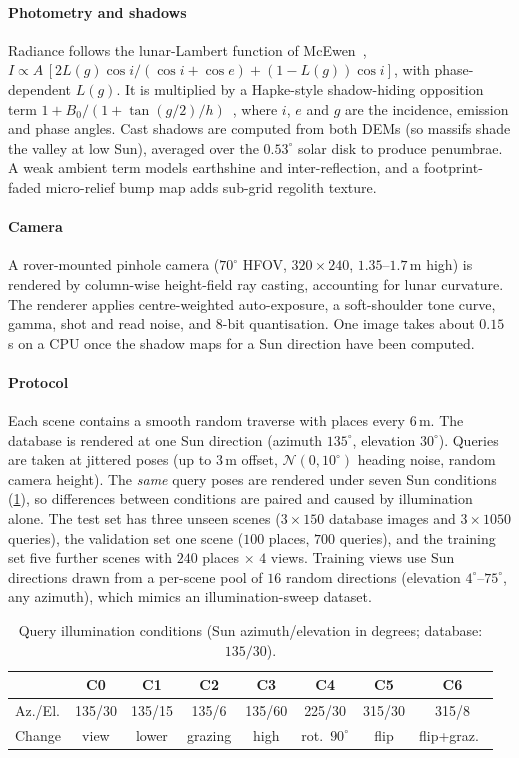 \paragraph*{Photometry and shadows}
Radiance follows the lunar-Lambert function of McEwen~\cite{mcewen1991photometric},
$I\propto A\,[2L(g)\cos i/(\cos i+\cos e)+(1-L(g))\cos i]$, with phase-dependent $L(g)$. It is
multiplied by a Hapke-style shadow-hiding opposition term
$1+B_0/(1+\tan(g/2)/h)$~\cite{hapke2012theory}, where $i$, $e$ and $g$ are the incidence, emission and
phase angles. Cast shadows are computed from both DEMs (so massifs shade the valley at low Sun),
averaged over the $0.53^\circ$ solar disk to produce penumbrae. A weak ambient term models
earthshine and inter-reflection, and a footprint-faded micro-relief bump map adds sub-grid regolith
texture.

\paragraph*{Camera}
A rover-mounted pinhole camera ($70^\circ$ HFOV, $320\times240$, $1.35$--$1.7$\,m high) is rendered
by column-wise height-field ray casting, accounting for lunar curvature. The renderer applies
centre-weighted auto-exposure, a soft-shoulder tone curve, gamma, shot and read noise, and 8-bit
quantisation. One image takes about $0.15$\,s on a CPU once the shadow maps for a Sun direction
have been computed.

\paragraph*{Protocol}
Each scene contains a smooth random traverse with places every $6$\,m. The database is rendered at
one Sun direction (azimuth $135^\circ$, elevation $30^\circ$). Queries are taken at jittered poses
(up to $3$\,m offset, $\mathcal{N}(0,10^\circ)$ heading noise, random camera height). The
\emph{same} query poses are rendered under seven Sun conditions (\cref{tab:conds}), so differences
between conditions are paired and caused by illumination alone. The test set has three unseen
scenes ($3\times150$ database images and $3\times1050$ queries), the validation set one scene
($100$ places, $700$ queries), and the training set five further scenes with $240$ places $\times$
$4$ views. Training views use Sun directions drawn from a per-scene pool of $16$ random
directions (elevation $4^\circ$--$75^\circ$, any azimuth), which mimics an illumination-sweep
dataset.

\begin{table}[t]
\centering
\caption{Query illumination conditions (Sun azimuth/elevation in degrees; database: $135/30$).}
\label{tab:conds}
\scriptsize
\setlength{\tabcolsep}{3pt}
\begin{tabular}{@{}lccccccc@{}}
\toprule
 & C0 & C1 & C2 & C3 & C4 & C5 & C6 \\
\midrule
Az./El. & 135/30 & 135/15 & 135/6 & 135/60 & 225/30 & 315/30 & 315/8 \\
Change & view & lower & grazing & high & rot.\ $90^\circ$ & flip & flip+graz.\ \\
\bottomrule
\end{tabular}
\end{table}
